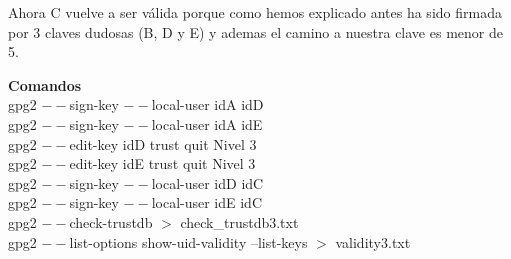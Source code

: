 \documentclass[11pt]{article}
\begin{document}
      \bigskip
      \par
      Ahora C vuelve a ser válida porque como hemos explicado antes ha sido firmada por 3 claves
      dudosas (B, D y E) y ademas el camino a nuestra clave es menor de 5.
      \par
      \textbf{Comandos}\\
      gpg2 $--$sign-key $--$local-user idA idD\\
      gpg2 $--$sign-key $--$local-user idA idE\\
      gpg2 $--$edit-key idD trust quit \hspace{10mm} Nivel 3\\
      gpg2 $--$edit-key idE trust quit \hspace{10mm} Nivel 3\\
      gpg2 $--$sign-key $--$local-user idD idC\\
      gpg2 $--$sign-key $--$local-user idE idC\\
      gpg2 $--$check-trustdb $>$ check\_trustdb3.txt\\
      gpg2 $--$list-options show-uid-validity --list-keys $>$ validity3.txt\\
    
\end{document}
